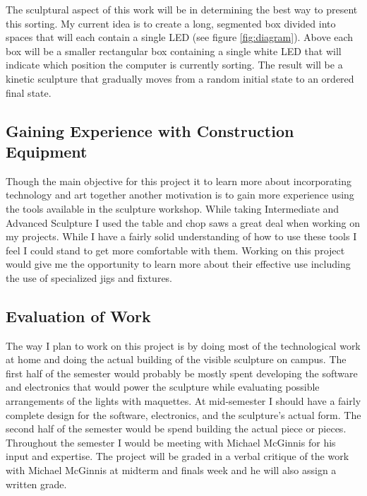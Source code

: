 \documentclass[12pt,a4paper]{article}
\begin{document}
The sculptural aspect of this work will be in determining the best way to
present this sorting.  My current idea is to create a long, segmented box
divided into spaces that will each contain a single LED (see figure
\ref{fig:diagram}).  Above each box will be a smaller rectangular box containing
a single white LED that will indicate which position the computer is currently
sorting.  The result will be a kinetic sculpture that gradually moves from a
random initial state to an ordered final state.

\subsection*{Gaining Experience with Construction Equipment}

Though the main objective for this project it to learn more about incorporating
technology and art together another motivation is to gain more experience using
the tools available in the sculpture workshop.  While taking Intermediate and
Advanced Sculpture I used the table and chop saws a great deal when working on
my projects.  While I have a fairly solid understanding of how to use these
tools I feel I could stand to get more comfortable with them.  Working on this
project would give me the opportunity to learn more about their effective use
including the use of specialized jigs and fixtures.

\subsection*{Evaluation of Work}

The way I plan to work on this project is by doing most of the technological
work at home and doing the actual building of the visible sculpture on campus.
The first half of the semester would probably be mostly spent developing the
software and electronics that would power the sculpture while evaluating
possible arrangements of the lights with maquettes.  At mid-semester I should
have a fairly complete design for the software, electronics, and the sculpture's
actual form.  The second half of the semester would be spend building the actual
piece or pieces.  Throughout the semester I would be meeting with Michael
McGinnis for his input and expertise.  The project will be graded in a verbal
critique of the work with Michael McGinnis at midterm and finals week and he
will also assign a written grade.


\end{document}
